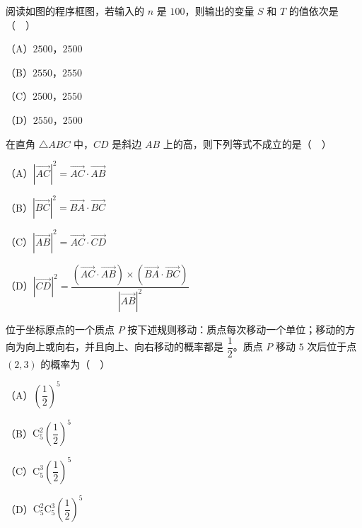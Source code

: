 \begin{question}
阅读如图的程序框图，若输入的 $n$ 是 $100$，则输出的变量 $S$ 和 $T$ 的值依次是（　）
\nopagebreak[4]
\begin{center}\end{center}
\nopagebreak[4]
（A）$2500$，$2500$

（B）$2550$，$2550$

（C）$2500$，$2550$

（D）$2550$，$2500$

\end{question}
\begin{question}
在直角 $\triangle ABC$ 中，$CD$ 是斜边 $AB$ 上的高，则下列等式不成立的是（　）

（A）$\left|\overrightarrow{AC}\right|^2=\overrightarrow{AC}\cdot\overrightarrow{AB}$

（B）$\left|\overrightarrow{BC}\right|^2=\overrightarrow{BA}\cdot\overrightarrow{BC}$

（C）$\left|\overrightarrow{AB}\right|^2=\overrightarrow{AC}\cdot\overrightarrow{CD}$

（D）$\left|\overrightarrow{CD}\right|^2=\dfrac{\left(\overrightarrow{AC}\cdot\overrightarrow{AB}\right)\times\left(\overrightarrow{BA}\cdot\overrightarrow{BC}\right)}{\left|\overrightarrow{AB}\right|^2}$

\end{question}
\begin{question}
位于坐标原点的一个质点 $P$ 按下述规则移动：质点每次移动一个单位；移动的方向为向上或向右，并且向上、向右移动的概率都是 $\dfrac12$。质点 $P$ 移动 $5$ 次后位于点 $(2,3)$ 的概率为（　）

（A）$\left(\dfrac12\right)^5$

（B）$\mathrm C_5^2\left(\dfrac12\right)^5$

（C）$\mathrm C_5^3\left(\dfrac12\right)^5$

（D）$\mathrm C_5^2\mathrm C_5^3\left(\dfrac12\right)^5$

\end{question}

